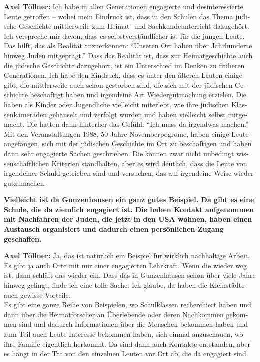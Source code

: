 \begin{otherlanguage}{ngerman}
\textbf{Axel Töllner:} Ich habe in allen Generationen engagierte und desinteressierte Leute getroffen – wobei mein Eindruck ist, dass in den Schulen das Thema jüdische Geschichte mittlerweile zum Heimat- und Sachkundeunterricht dazugehört. Ich verspreche mir davon, dass es selbstverständlicher ist für die jungen Leute. Das hilft, das als Realität anzuerkennen: "`Unseren Ort haben über Jahrhunderte hinweg Juden mitgeprägt."' Dass das Realität ist, dass zur Heimatgeschichte auch die jüdische Geschichte dazugehört, ist ein Unterschied im Denken zu früheren Generationen. Ich habe den Eindruck, dass es unter den älteren Leuten einige gibt, die mittlerweile auch schon gestorben sind, die sich mit der jüdischen Geschichte beschäftigt haben und irgendeine Art Wiedergutmachung erzielen. Die haben als Kinder oder Jugendliche vielleicht miterlebt, wie ihre jüdischen Klassenkameraden gehänselt und verfolgt wurden und haben vielleicht selbst mitgemacht. Die hatten dann hinterher das Gefühl: "`Ich muss da irgendwas machen."' Mit den Veranstaltungen 1988, 50 Jahre Novemberpogrome, haben einige Leute angefangen, sich mit der jüdischen Geschichte im Ort zu beschäftigen und haben dann sehr engagierte Sachen geschrieben. Die können zwar nicht unbedingt wissenschaftlichen Kriterien standhalten, aber es wird deutlich, dass die Leute von irgendeiner Schuld getrieben sind und versuchen, das auf irgendeine Weise wieder gutzumachen. 

\textbf{Vielleicht ist da Gunzenhausen ein ganz gutes Beispiel. Da gibt es eine Schule, die da ziemlich engagiert ist. Die haben Kontakt aufgenommen mit Nachfahren der Juden, die jetzt in den USA wohnen, haben einen Austausch organisiert und dadurch einen persönlichen Zugang geschaffen.}
 
\textbf{Axel Töllner:} Ja, das ist natürlich ein Beispiel für wirklich nachhaltige Arbeit. Es gibt ja auch Orte mit nur einer engagierten Lehrkraft. Wenn die wieder weg ist, dann schläft das wieder ein. Dass das in Gunzenhausen schon über viele Jahre hinweg gelingt, finde ich eine tolle Sache. Ich glaube, da haben die Kleinstädte auch gewisse Vorteile.\\  
Es gibt eine ganze Reihe von Beispielen, wo Schulklassen recherchiert haben und dann über die Heimatforscher an Überlebende oder deren Nachkommen gekommen sind und dadurch Informationen über die Menschen bekommen haben und zum Teil auch Leute Interesse bekommen haben, sich einmal anzuschauen, wo ihre Familie eigentlich herkommt. Da sind dann auch Kontakte entstanden, aber es hängt in der Tat von den einzelnen Leuten vor Ort ab, die da engagiert sind. 


\end{otherlanguage}
